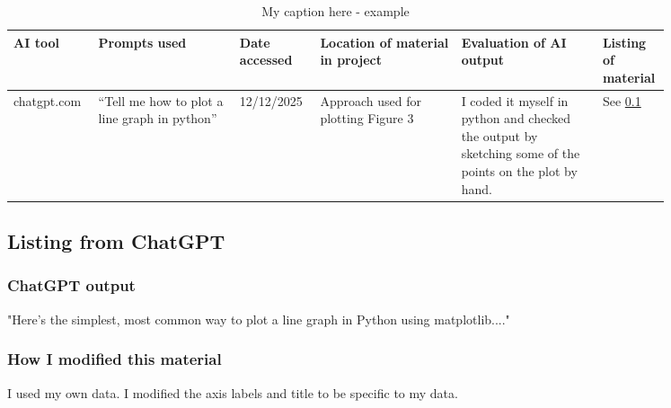 \documentclass[11pt,a4paper]{article}
\begin{document}
\begin{appendix}
\begin{table}
    \centering
    \begin{tabular}{|p{0.1 \linewidth}|p{0.2 \linewidth}|p{0.1 \linewidth}|p{0.2 \linewidth}|p{0.2 \linewidth}|p{0.05 \linewidth}|}
         AI tool& Prompts used & Date accessed & Location of material in project & Evaluation of AI output & Listing of material  \\
         \hline
chatgpt.com
 & “Tell me how to plot a line graph in python”
 & 12/12/2025
 & Approach used for plotting Figure 3
 & I coded it myself in python and checked the output by sketching some of the points on the plot by hand. 
 & See \ref{app: ChatGPT} \\
 \hline
    \end{tabular}
    \caption{My caption here - example}
    \label{tab:placeholder}
\end{table}

\subsection{Listing from ChatGPT} \label{app: ChatGPT}

\subsubsection{ChatGPT output}

"Here’s the simplest, most common way to plot a line graph in Python using matplotlib...."

\subsubsection{How I modified this material }
I used my own data. I modified the axis labels and title to be specific to my data. 
\end{appendix}
\end{document}
